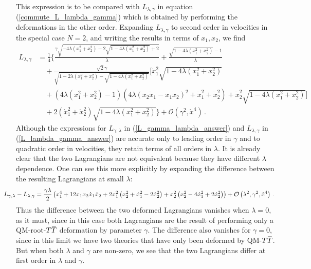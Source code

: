 \documentclass[12pt]{article}
\numberwithin{equation}{section}
\newcommand{\overbar}[1]{\mkern 1.5mu\overline{\mkern-1.5mu#1\mkern-1.5mu}\mkern 1.5mu}
\def\TT{{T\overbar{T}}}
\begin{document}
%
This expression is to be compared with $L_{\lambda, \gamma}$ in equation (\ref{commute_L_lambda_gamma}) which is obtained by performing the deformations in the other order. Expanding $L_{\lambda, \gamma}$ to second order in velocities in the special case $N=2$, and writing the results in terms of $x_1, x_2$, we find
%
\begin{align}\label{L_lambda_gamma_answer}
    L_{\lambda, \gamma} &= \frac{1}{4} \Bigg\{ \frac{\gamma  \sqrt{-4 \lambda  \left( x_1^2+ x_2^2\right)-2 \sqrt{1-4 \lambda  \left( x_1^2+ x_2^2\right)}+2}}{\lambda } + \frac{\sqrt{1-4 \lambda  \left( x_1^2+ x_2^2\right)}-1}{\lambda } \nonumber \\
    &\quad + \frac{\sqrt{2} \gamma}{\sqrt{1 -2 \lambda  \left( x_1^2+ x_2^2\right)-\sqrt{1-4 \lambda  \left( x_1^2+ x_2^2\right)}}} \Bigg[  \dot{x}_1^2 \sqrt{1-4 \lambda  \left( x_1^2+ x_2^2\right)} \nonumber \\
    &\quad + \left(4 \lambda  \left( x_1^2+ x_2^2\right)-1\right) \left(4 \lambda  ( x_2  \dot{x}_1- x_1  \dot{x}_2)^2+ \dot{x}_1^2+ \dot{x}_2^2\right)+ \dot{x}_2^2 \sqrt{1-4 \lambda  \left( x_1^2+ x_2^2\right)} \Bigg] \nonumber \\
    &\quad +2 \left( \dot{x}_1^2+ \dot{x}_2^2\right) \sqrt{1-4 \lambda  \left( x_1^2+ x_2^2\right)} \Bigg\} + \mathcal{O} \left( \gamma^2, \dot{x}^4 \right) \, .
\end{align}
%
Although the expressions for $L_{\gamma, \lambda}$ in (\ref{L_gamma_lambda_answer}) and $L_{\lambda, \gamma}$ in (\ref{L_lambda_gamma_answer}) are accurate only to leading order in $\gamma$ and to quadratic order in velocities, they retain terms of all orders in $\lambda$. It is already clear that the two Lagrangians are not equivalent because they have different $\lambda$ dependence. One can see this more explicitly by expanding the difference between the resulting Lagrangians at small $\lambda$:
%
\begin{align}\hspace{-20pt}
    L_{\gamma, \lambda} - L_{\lambda, \gamma} = \frac{\gamma \lambda}{2} \left( x_1^4 + 12 x_1 x_2 \dot{x}_1 \dot{x}_2 + 2 x_1^2 \left( x_2^2 + \dot{x}_1^2 - 2 \dot{x}_2^2 \right) + x_2^2 \left( x_2^2 - 4 \dot{x}_1^2 + 2 \dot{x}_2^2 \right) \right) + \mathcal{O} \left( \lambda^2, \gamma^2, \dot{x}^4 \right) \, .
\end{align}
%
Thus the difference between the two deformed Lagrangians vanishes when $\lambda = 0$, as it must, since in this case both Lagrangians are the result of performing only a QM-root-$\TT$ deformation by parameter $\gamma$. The difference also vanishes for $\gamma = 0$, since in this limit we have two theories that have only been deformed by QM-$\TT$. But when both $\lambda$ and $\gamma$ are non-zero, we see that the two Lagrangians differ at first order in $\lambda$ and $\gamma$.
\end{document}
